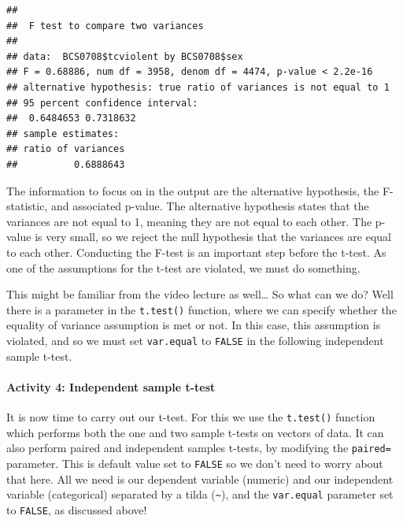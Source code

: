 \documentclass[
]{book}
\newenvironment{Shaded}{\begin{snugshade}}{\end{snugshade}}
\newcommand{\AttributeTok}[1]{\textcolor[rgb]{0.77,0.63,0.00}{#1}}
\newcommand{\CommentTok}[1]{\textcolor[rgb]{0.56,0.35,0.01}{\textit{#1}}}
\newcommand{\ConstantTok}[1]{\textcolor[rgb]{0.00,0.00,0.00}{#1}}
\newcommand{\FunctionTok}[1]{\textcolor[rgb]{0.00,0.00,0.00}{#1}}
\newcommand{\NormalTok}[1]{#1}
\newcommand{\SpecialCharTok}[1]{\textcolor[rgb]{0.00,0.00,0.00}{#1}}
\begin{document}
\begin{verbatim}
## 
##  F test to compare two variances
## 
## data:  BCS0708$tcviolent by BCS0708$sex
## F = 0.68886, num df = 3958, denom df = 4474, p-value < 2.2e-16
## alternative hypothesis: true ratio of variances is not equal to 1
## 95 percent confidence interval:
##  0.6484653 0.7318632
## sample estimates:
## ratio of variances 
##          0.6888643
\end{verbatim}

The information to focus on in the output are the alternative hypothesis, the F-statistic, and associated p-value. The alternative hypothesis states that the variances are not equal to 1, meaning they are not equal to each other. The p-value is very small, so we reject the null hypothesis that the variances are equal to each other. Conducting the F-test is an important step before the t-test. As one of the assumptions for the t-test are violated, we must do something.

This might be familiar from the video lecture as well\ldots{} So what can we do? Well there is a parameter in the \texttt{t.test()} function, where we can specify whether the equality of variance assumption is met or not. In this case, this assumption is violated, and so we must set \texttt{var.equal} to \texttt{FALSE} in the following independent sample t-test.

\hypertarget{activity-4-independent-sample-t-test}{%
\paragraph{Activity 4: Independent sample t-test}\label{activity-4-independent-sample-t-test}}

It is now time to carry out our t-test. For this we use the \texttt{t.test()} function which performs both the one and two sample t-tests on vectors of data. It can also perform paired and independent samples t-tests, by modifying the \texttt{paired=} parameter. This is default value set to \texttt{FALSE} so we don't need to worry about that here. All we need is our dependent variable (numeric) and our independent variable (categorical) separated by a tilda (\texttt{\textasciitilde{}}), and the \texttt{var.equal} parameter set to \texttt{FALSE}, as discussed above!

\begin{Shaded}
\end{Shaded}
\end{document}
